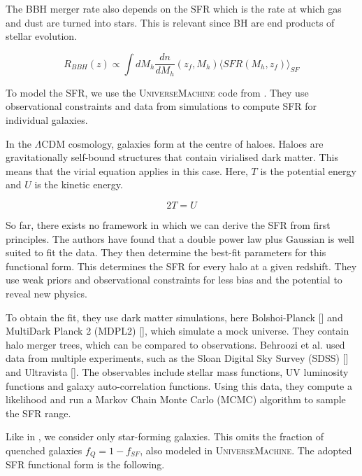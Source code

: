 The BBH merger rate also depends on the SFR which is the rate at which gas and dust are turned into stars. This is relevant since BH are end products of stellar evolution.

\begin{equation}
    R_{BBH}(z) \propto \int dM_h \frac{dn}{dM_h}(z_f, M_h)\langle SFR(M_h, z_f)\rangle_{SF}
\end{equation}


To model the SFR, we use the \textsc{UniverseMachine} code from \cite{behroozi_universemachine_2019}. They use observational constraints and data from simulations to compute SFR for individual galaxies.

In the $\Lambda$CDM cosmology, galaxies form at the centre of haloes. Haloes are gravitationally self-bound structures that contain virialised dark matter. This means that the virial equation applies in this case. Here, $T$ is the potential energy and $U$ is the kinetic energy.

\begin{equation}
    2T=U
\end{equation}

So far, there exists no framework in which we can derive the SFR from first principles. The authors have found that a double power law plus Gaussian is well suited to fit the data. They then determine the best-fit parameters for this functional form. This determines the SFR for every halo at a given redshift. They use weak priors and observational constraints for less bias and the potential to reveal new physics.

To obtain the fit, they use dark matter simulations, here Bolshoi-Planck [\cite{klypin_dark_2011}] and MultiDark Planck 2 (MDPL2) [\cite{klypin_multidark_2016}], which simulate a mock universe. They contain halo merger trees, which can be compared to observations. Behroozi et al. used data from multiple experiments, such as the Sloan Digital Sky Survey (SDSS) [\cite{abazajian_seventh_2009}] and Ultravista [\cite{mccracken_ultravista_2012}]. The observables include stellar mass functions, UV luminosity functions and galaxy auto-correlation functions.
Using this data, they compute a likelihood and run a Markov Chain Monte Carlo (MCMC) algorithm to sample the SFR range.

Like in \cite{dallarmi_dipole_2022}, we consider only star-forming galaxies. This omits the fraction of quenched galaxies $f_Q = 1 -f_{SF}$, also modeled in \textsc{UniverseMachine}. The adopted SFR functional form is the following. 

